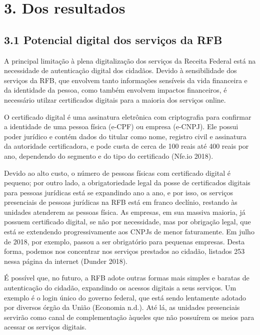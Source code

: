 \documentclass[]{article}
\begin{document}
\hypertarget{dos-resultados}{%
\section{3. Dos resultados}\label{dos-resultados}}

\hypertarget{potencial-digital-dos-servicos-da-rfb}{%
\subsection{3.1 Potencial digital dos serviços da
RFB}\label{potencial-digital-dos-servicos-da-rfb}}

A principal limitação à plena digitalização dos serviços da Receita
Federal está na necessidade de autenticação digital dos cidadãos. Devido
à sensibilidade dos serviços da RFB, que envolvem tanto informações
sensíveis da vida financeira e da identidade da pessoa, como também
envolvem impactos financeiros, é necessário utilzar certificados
digitais para a maioria dos serviços online.

O certificado digital é uma assinatura eletrônica com criptografia para
confirmar a identidade de uma pessoa física (e-CPF) ou empresa (e-CNPJ).
Ele possui poder jurídico e contém dados do titular como nome, registro
civil e assinatura da autoridade certificadora, e pode custa de cerca de
100 reais até 400 reais por ano, dependendo do segmento e do tipo do
certificado (Nfe.io 2018).

Devido ao alto custo, o número de pessoas físicas com certificado
digital é pequeno; por outro lado, a obrigatoriedade legal da posse de
certificados digitais para pessoas jurídicas está se expandindo ano a
ano, e por isso, os serviços presenciais de pessoas jurídicas na RFB
está em franco declínio, restando às unidades atenderem as pessoas
física. As empresas, em sua massiva maioria, já possuem certificado
digital, se não por necessidade, mas por obrigação legal, que está se
extendendo progressivamente aos CNPJs de menor faturamente. Em julho de
2018, por exemplo, passou a ser obrigatório para pequenas empresas.
Desta forma, podemos nos concentrar nos serviços prestados ao cidadão,
listados 253 nessa página da internet (Dunder 2018).

É possível que, no futuro, a RFB adote outras formas mais simples e
baratas de autenticação do cidadão, expandindo os acessos digitais a
seus serviços. Um exemplo é o login único do governo federal, que está
sendo lentamente adotado por diversos órgão da União (Economia n.d.).
Até lá, as unidades presenciais servirão como canal de complementação
àqueles que não possuírem os meios para acessar os serviços digitais.
\end{document}
